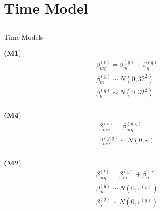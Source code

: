 \documentclass[ xcolor = pdftex, dvipsnames, table ]{beamer}
\begin{document}
%
%

%
\section{Time Model}
\subsection{}
\begin{frame}{Time Models}
\hspace*{-0.5cm}
\begin{minipage}{0.3\textwidth}
\begin{center}
\textbf{(M1)}
\begin{eqnarray*}
&\beta^{(t)}_{m\eta} = \beta^{(y)}_{m} + \beta^{(q)}_{\eta}&\\
&\beta^{(y)}_{m} \sim N(0, 32^2)&\\
&\beta^{(q)}_{\eta} \sim N(0, 32^2)&\\
&~&
\end{eqnarray*}
\end{center}

\begin{center}
\textbf{(M4)}
\begin{eqnarray*}
&\beta^{(t)}_{m\eta} = \beta^{(y:q)}_{m\eta}&\\
&\beta^{(y:q)}_{m\eta} \sim N(0, v)&\\
&~&
\end{eqnarray*}
\end{center}
\end{minipage}
\begin{minipage}{0.3\textwidth}
\begin{center}
\textbf{(M2)}
\begin{eqnarray*}
&\beta^{(t)}_{m\eta} = \beta^{(y)}_{m} + \beta^{(q)}_{\eta}&\\
&\beta^{(y)}_{m} \sim N(0, v^{(y)})&\\
&\beta^{(q)}_{\eta} \sim N(0, v^{(q)})&\\
&~&
\end{eqnarray*}
\end{center}


\end{minipage}
\end{frame}
\end{document}
